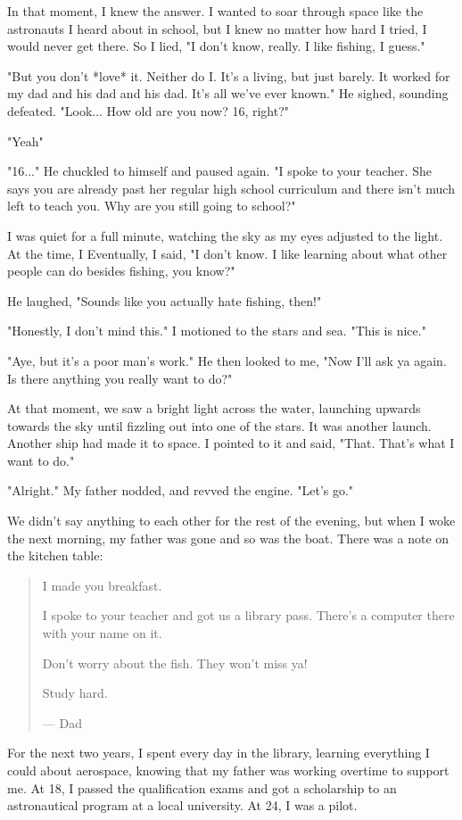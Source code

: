 In that moment, I knew the answer.
I wanted to soar through space like the astronauts I heard about in school, but I knew no matter how hard I tried, I would never get there.
So I lied, "I don't know, really. I like fishing, I guess."

"But you don't *love* it. Neither do I. It's a living, but just barely. It worked for my dad and his dad and his dad. It's all we've ever known."
He sighed, sounding defeated.
"Look... How old are you now? 16, right?"

"Yeah"

"16..." He chuckled to himself and paused again. "I spoke to your teacher. She says you are already past her regular high school curriculum and there isn't much left to teach you. Why are you still going to school?"

I was quiet for a full minute, watching the sky as my eyes adjusted to the light.
At the time, I 
Eventually, I said, "I don't know. I like learning about what other people can do besides fishing, you know?"

He laughed, "Sounds like you actually hate fishing, then!"

"Honestly, I don't mind this." I motioned to the stars and sea. "This is nice."

"Aye, but it's a poor man's work." He then looked to me, "Now I'll ask ya again. Is there anything you really want to do?"

At that moment, we saw a bright light across the water, launching upwards towards the sky until fizzling out into one of the stars.
It was another launch.
Another ship had made it to space.
I pointed to it and said, "That. That's what I want to do."

"Alright." My father nodded, and revved the engine. "Let's go."

We didn't say anything to each other for the rest of the evening, but when I woke the next morning, my father was gone and so was the boat.
There was a note on the kitchen table:

\begin{quote}
I made you breakfast.

I spoke to your teacher and got us a library pass.
There's a computer there with your name on it.

Don't worry about the fish.
They won't miss ya!

Study hard.

--- Dad
\end{quote}

For the next two years, I spent every day in the library, learning everything I could about aerospace, knowing that my father was working overtime to support me.
At 18, I passed the qualification exams and got a scholarship to an astronautical program at a local university.
At 24, I was a pilot.

